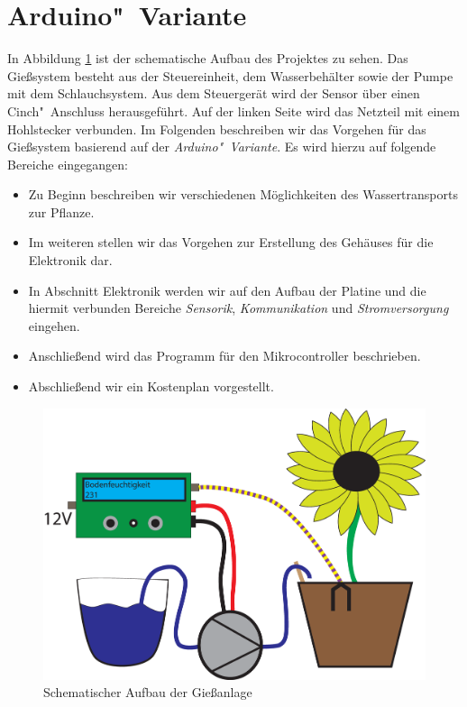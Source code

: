 \section{Arduino"~Variante}

In Abbildung \ref{fig-SchemaAufbau} ist der schematische Aufbau des Projektes zu sehen. Das Gießsystem besteht aus der Steuereinheit, dem Wasserbehälter sowie der Pumpe mit dem Schlauchsystem. Aus dem Steuergerät wird der Sensor über einen Cinch"~Anschluss herausgeführt. Auf der linken Seite wird das Netzteil mit einem Hohlstecker verbunden. 
Im Folgenden beschreiben wir das Vorgehen für das Gießsystem basierend auf der \emph{Arduino"~Variante}. 
Es wird hierzu auf folgende Bereiche eingegangen:

\begin{itemize}
	\item Zu Beginn beschreiben wir verschiedenen Möglichkeiten des Wassertransports zur Pflanze.
	\item Im weiteren stellen wir das Vorgehen zur Erstellung des Gehäuses für die Elektronik dar.
	\item In Abschnitt Elektronik werden wir auf den Aufbau der Platine und die hiermit verbunden Bereiche \emph{Sensorik}, \emph{Kommunikation} und \emph{Stromversorgung} eingehen.
	\item Anschließend wird das Programm für den Mikrocontroller beschrieben.
	\item Abschließend wir ein Kostenplan vorgestellt. 
	
\end{itemize}

	\begin{figure}[ht]
	\centering
	\includegraphics[width=0.9\linewidth]{bilder/Bild_Aufbau.eps}	
	\caption{Schematischer Aufbau der Gießanlage}
	\label{fig-SchemaAufbau}
	\end{figure}

